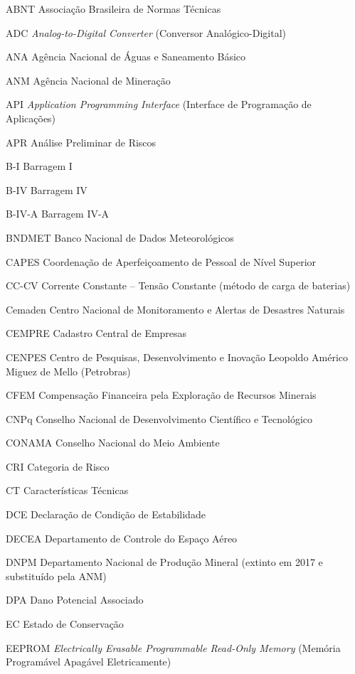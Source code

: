\begin{siglas}
    \item[ABNT] Associação Brasileira de Normas Técnicas
    \item[ADC] \textit{Analog-to-Digital Converter} (Conversor Analógico-Digital)
    \item[ANA] Agência Nacional de Águas e Saneamento Básico
    \item[ANM] Agência Nacional de Mineração
    \item[API] \textit{Application Programming Interface} (Interface de Programação de Aplicações)
    \item[APR] Análise Preliminar de Riscos
    \item[B-I] Barragem I
    \item[B-IV] Barragem IV
    \item[B-IV-A] Barragem IV-A
    \item[BNDMET] Banco Nacional de Dados Meteorológicos
    \item[CAPES] Coordenação de Aperfeiçoamento de Pessoal de Nível Superior
    \item[CC-CV] Corrente Constante -- Tensão Constante (método de carga de baterias)
    \item[Cemaden] Centro Nacional de Monitoramento e Alertas de Desastres Naturais
    \item[CEMPRE] Cadastro Central de Empresas
    \item[CENPES] Centro de Pesquisas, Desenvolvimento e Inovação Leopoldo Américo Miguez de Mello (Petrobras)
    \item[CFEM] Compensação Financeira pela Exploração de Recursos Minerais
    \item[CNPq] Conselho Nacional de Desenvolvimento Científico e Tecnológico
    \item[CONAMA] Conselho Nacional do Meio Ambiente
    \item[CRI] Categoria de Risco
    \item[CT] Características Técnicas
    \item[DCE] Declaração de Condição de Estabilidade
    \item[DECEA] Departamento de Controle do Espaço Aéreo
    \item[DNPM] Departamento Nacional de Produção Mineral (extinto em 2017 e substituído pela ANM)
    \item[DPA] Dano Potencial Associado
    \item[EC] Estado de Conservação
    \item[EEPROM] \textit{Electrically Erasable Programmable Read-Only Memory} (Memória Programável Apagável Eletricamente)

\end{siglas}
